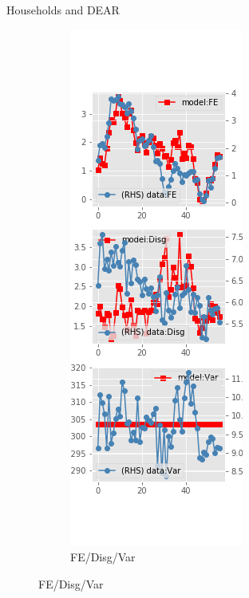 \documentclass{beamer}
\begin{document}
\begin{frame}{Households and DEAR}
\begin{figure}[ht]
\begin{subfigure}[b]{0.2\textwidth}
		\end{subfigure}
		\hfill
		\begin{subfigure}[b]{0.2\textwidth}
			\caption{FE/Disg/Var}
			\includegraphics[width=\textwidth, height = 0.8\textheight]{figuresDraft/sce_de_est_diag2.png}
		\end{subfigure}
	\end{figure}
\end{frame}
\end{document}
